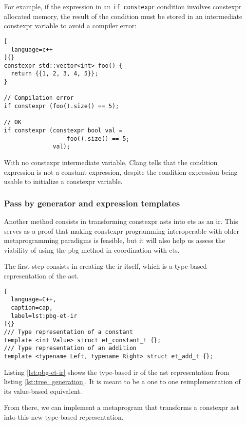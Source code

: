 \documentclass[../main]{subfiles}
\begin{document}
\clearpage%

For example, if the expression in an \lstinline{if constexpr}
condition involves \gls{constexpr} allocated memory, the result of the condition
must be stored in an intermediate \gls{constexpr} variable to avoid a compiler
error:

\begin{lstlisting}[
  language=c++
]{}
constexpr std::vector<int> foo() {
  return {{1, 2, 3, 4, 5}};
}

// Compilation error
if constexpr (foo().size() == 5);

// OK
if constexpr (constexpr bool val =
                  foo().size() == 5;
              val);
\end{lstlisting}

With no \gls{constexpr} intermediate variable, Clang tells that the condition
expression is not a constant expression, despite the condition expression being
usable to initialize a \gls{constexpr} variable.

\subsubsection{
  Pass by generator and expression templates
}

\label{lbl:pbg-et-technique}

Another method consists in transforming \gls{constexpr} \glspl{ast}
into \glspl{et} as an \gls{ir}. This serves as a proof that making
\gls{constexpr} programming interoperable with older metaprogramming
paradigms is feasible, but it will also help us assess the viability
of using the \gls{pbg} method in coordination with \glspl{et}.

The first step consists in creating the \gls{ir} itself, which is a type-based
representation of the \gls{ast}.

\begin{lstlisting}[
  language=C++,
  caption=cap,
  label=lst:pbg-et-ir
]{}
/// Type representation of a constant
template <int Value> struct et_constant_t {};
/// Type representation of an addition
template <typename Left, typename Right> struct et_add_t {};
\end{lstlisting}


Listing \ref{lst:pbg-et-ir} shows the type-based \gls{ir} of the \gls{ast}
representation from listing \ref{lst:tree_generation}. It is meant to be
a one to one reimplementation of its value-based equivalent.

From there, we can implement a metaprogram that transforms a \gls{constexpr}
\gls{ast} into this new type-based representation.
\end{document}
